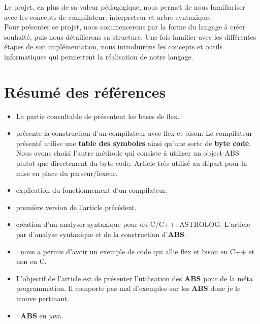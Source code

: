 \documentclass[a4paper]{article}
\begin{document}
Le projet, en plus de sa valeur pédagogique, nous permet de nous familiariser avec les concepts de compilateur, interpreteur et arbre syntaxique.\\

Pour présenter ce projet, nous commencerons par la forme du langage à créer souhaité, puis nous détaillerons sa structure. Une fois familier avec les différentes étapes de son implémentation,  nous introduirons les concepts et outils informatiques qui permettent la réalisation de notre langage.\\

\normalsize
\clearpage{}



\section{Résumé des références}

\begin{itemize}
  \item La partie consultable de \cite{flexBisonHandbook} présentent les bases
    de flex.
  \item \cite{compilerFlexBison} présente la construction d'un compilateur avec
    flex et bison. Le compilateur présenté utilise une \textbf{table des
    symboles} ainsi qu'une sorte de \textbf{byte code}. Nous avons choisi
    l'autre méthode qui consiste à utiliser un object-ABS plutot que directement
    du byte code. Article très utilisé au départ pour la mise en place du
    parseur/lexeur.
  \item \cite{compilerTICH} explication du fonctionnement d'un compilateur.
  \item \cite{compilerTILB} première version de l'article précédent.
  \item \cite{crew1997astlog} création d'un analyser syntaxique pour du C/C++:
    ASTROLOG. L'article par d'analyse syntaxique et de la construction
    d'\textbf{ABS}.
  \item \cite{cppparsing}: nous a permis d'avoir un exemple de code qui allie
    flex et bison en C++ et non en C.
  \item \cite{visser2002meta} L'objectif de l'article est de présenter
    l'utilisation des \textbf{ABS} pour de la méta programmation. Il comporte
    pas mal d'exemples sur les \textbf{ABS} donc je le trouve pertinant.
  \item \cite{gagnon1998sablecc}: \textbf{ABS} en java.
\end{itemize}
\end{document}
